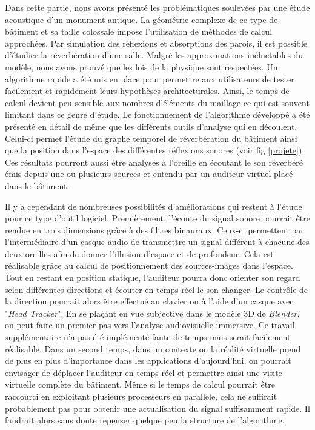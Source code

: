 Dans cette partie, nous avons présenté les problématiques soulevées par une étude acoustique d'un monument antique. La géométrie complexe de ce type de bâtiment et sa taille colossale impose l'utilisation de méthodes de calcul approchées. Par simulation des réflexions et absorptions des parois, il est possible d'étudier la réverbération d'une salle. Malgré les approximations inéluctables du modèle, nous avons prouvé que les lois de la physique sont respectées. Un algorithme rapide a été mis en place pour permettre aux utilisateurs de tester facilement et rapidement leurs hypothèses architecturales. Ainsi, le temps de calcul devient peu sensible aux nombres d'éléments du maillage ce qui est souvent limitant dans ce genre d'étude. Le fonctionnement de l'algorithme développé a été présenté en détail de même que les différents outils d'analyse qui en découlent. Celui-ci permet l'étude du graphe temporel de réverbération du bâtiment ainsi que la position dans l'espace des différentes réflexions sonores (voir fig \ref{projete}). Ces résultats pourront aussi être analysés à l'oreille en écoutant le son réverbéré émis depuis une ou plusieurs sources et entendu par un auditeur virtuel placé dans le bâtiment. %
%
%


Il y a cependant de nombreuses possibilités d'améliorations qui restent à l'étude pour ce type d'outil logiciel. Premièrement, l'écoute du signal sonore pourrait être rendue en trois dimensions grâce à des filtres binauraux. Ceux-ci permettent par l'intermédiaire d'un casque audio de transmettre un signal différent à chacune des deux oreilles afin de donner l'illusion d'espace et de profondeur. Cela est réalisable grâce au calcul de positionnement des sources-images dans l'espace. Tout en restant en position statique, l'auditeur pourra donc orienter son regard selon différentes directions et écouter en temps réel le son changer. Le contrôle de la direction pourrait alors être effectué au clavier ou à l'aide d'un casque avec "\textit{Head Tracker}". En se plaçant en vue subjective dans le modèle 3D de \textit{Blender}, on peut faire un premier pas vers l'analyse audiovisuelle immersive. Ce travail supplémentaire n'a pas été implémenté faute de temps mais serait facilement réalisable. Dans un second temps, dans un contexte ou la réalité virtuelle prend de plus en plus d'importance dans les applications d'aujourd'hui, on pourrait envisager de déplacer l'auditeur en temps réel et permettre ainsi une visite virtuelle complète du bâtiment. Même si le temps de calcul pourrait être raccourci en exploitant plusieurs processeurs en parallèle, cela ne suffirait probablement pas pour obtenir une actualisation du signal suffisamment rapide. Il faudrait alors sans doute repenser quelque peu la structure de l'algorithme.

